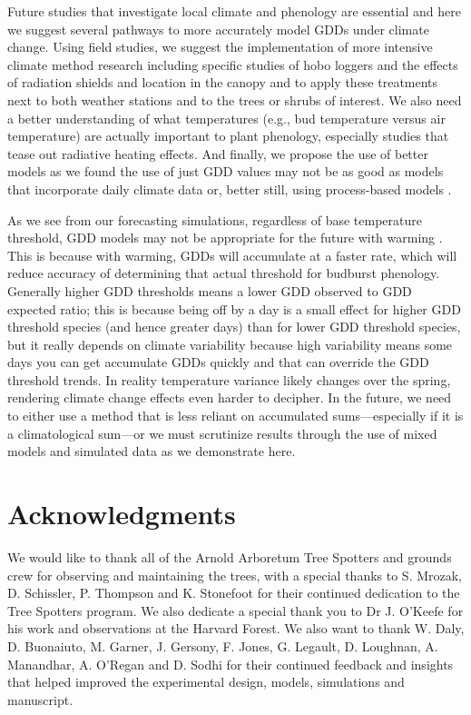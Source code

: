 \documentclass{article}\usepackage[]{graphicx}\usepackage[]{color}
\begin{document}
Future studies that investigate local climate and phenology are essential and here we suggest several pathways to more accurately model GDDs under climate change. Using field studies, we suggest the implementation of more intensive climate method research including specific studies of hobo loggers and the effects of radiation shields and location in the canopy and to apply these treatments next to both weather stations and to the trees or shrubs of interest. We also need a better understanding of what temperatures (e.g., bud temperature versus air temperature) are actually important to plant phenology, especially studies that tease out radiative heating effects. And finally, we propose the use of better models as we found the use of just GDD values may not be as good as models that incorporate daily climate data or, better still, using process-based models \citep{Keenan2019}.
  
As we see from our forecasting simulations, regardless of base temperature threshold, GDD models may not be appropriate for the future with warming \citep{Man2010}. This is because with warming, GDDs will accumulate at a faster rate, which will reduce accuracy of determining that actual threshold for budburst phenology. Generally higher GDD thresholds means a lower GDD observed to GDD expected ratio; this is because being off by a day is a small effect for higher GDD threshold species (and hence greater days) than for lower GDD threshold species, but it really depends on climate variability because high variability means some days you can get accumulate GDDs quickly and that can override the GDD threshold trends. In reality temperature variance likely changes over the spring, rendering climate change effects even harder to decipher. In the future, we need to either use a method that is less reliant on accumulated sums---especially if it is a climatological sum---or we must scrutinize results through the use of mixed models and simulated data as we demonstrate here.

\section*{Acknowledgments}
We would like to thank all of the Arnold Arboretum Tree Spotters and grounds crew for observing and maintaining the trees, with a special thanks to S. Mrozak, D. Schissler, P. Thompson and K. Stonefoot for their continued dedication to the Tree Spotters program. We also dedicate a special thank you to Dr J. O'Keefe for his work and observations at the Harvard Forest. We also want to thank W. Daly, D. Buonaiuto, M. Garner, J. Gersony, F. Jones, G. Legault, D. Loughnan, A. Manandhar, A. O'Regan and D. Sodhi for their continued feedback and insights that helped improved the experimental design, models, simulations and manuscript. 
\end{document}
